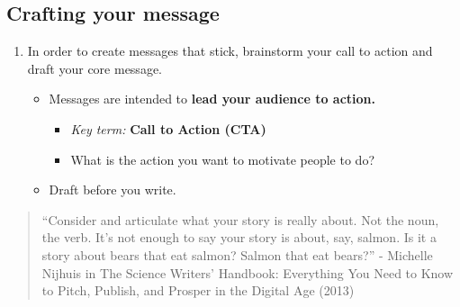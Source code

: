 \documentclass[
]{book}
\providecommand{\tightlist}{%
  \setlength{\itemsep}{0pt}\setlength{\parskip}{0pt}}
\begin{document}
\hypertarget{crafting-your-message}{%
\subsection{Crafting your message}\label{crafting-your-message}}

\begin{enumerate}
\def\labelenumi{\arabic{enumi}.}
\tightlist
\item
  In order to create messages that stick, brainstorm your call to action and draft your core message.

  \begin{itemize}
  \tightlist
  \item
    Messages are intended to \textbf{lead your audience to action.}

    \begin{itemize}
    \tightlist
    \item
      \emph{Key term: }\textbf{Call to Action (CTA)}
    \item
      What is the action you want to motivate people to do?
    \end{itemize}
  \item
    Draft before you write.
  \end{itemize}
\end{enumerate}

\begin{quote}
``Consider and articulate what your story is really about. Not the noun, the verb. It's not enough to say your story is about, say, salmon. Is it a story about bears that eat salmon? Salmon that eat bears?'' - Michelle Nijhuis in The Science Writers' Handbook: Everything You Need to Know to Pitch, Publish, and Prosper in the Digital Age (2013)
\end{quote}
\end{document}
